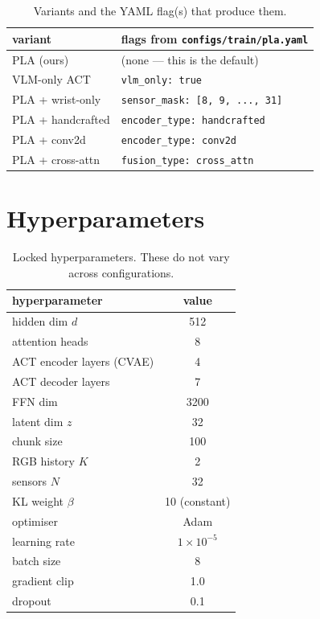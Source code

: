 \documentclass[11pt]{article}
\begin{document}
\begin{table}[h]
\centering
\caption{Variants and the YAML flag(s) that produce them.}
\small
\begin{tabular}{ll}
\toprule
variant & flags from \texttt{configs/train/pla.yaml} \\
\midrule
PLA (ours)       & (none --- this is the default) \\
VLM-only ACT     & \texttt{vlm\_only: true} \\
PLA + wrist-only & \texttt{sensor\_mask: [8, 9, ..., 31]} \\
PLA + handcrafted & \texttt{encoder\_type: handcrafted} \\
PLA + conv2d     & \texttt{encoder\_type: conv2d} \\
PLA + cross-attn & \texttt{fusion\_type: cross\_attn} \\
\bottomrule
\end{tabular}
\end{table}

\section{Hyperparameters}
\label{app:hyperparams}

\begin{table}[h]
\centering
\caption{Locked hyperparameters. These do not vary across configurations.}
\small
\begin{tabular}{lc}
\toprule
hyperparameter & value \\
\midrule
hidden dim $d$               & 512 \\
attention heads              & 8 \\
ACT encoder layers (CVAE)    & 4 \\
ACT decoder layers           & 7 \\
FFN dim                      & 3200 \\
latent dim $z$               & 32 \\
chunk size                    & 100 \\
RGB history $K$              & 2 \\
sensors $N$                  & 32 \\
KL weight $\beta$            & 10 (constant) \\
optimiser                    & Adam \\
learning rate                & $1 \times 10^{-5}$ \\
batch size                   & 8 \\
gradient clip                & 1.0 \\
dropout                       & 0.1 \\
\bottomrule
\end{tabular}
\end{table}
\end{document}
